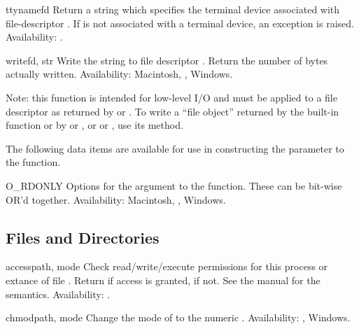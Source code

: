 \begin{funcdesc}{ttyname}{fd}
Return a string which specifies the terminal device associated with
file-descriptor .  If  is not associated with a terminal
device, an exception is raised.
Availability: \UNIX{}.
\end{funcdesc}

\begin{funcdesc}{write}{fd, str}
Write the string  to file descriptor .
Return the number of bytes actually written.
Availability: Macintosh, \UNIX{}, Windows.

Note: this function is intended for low-level I/O and must be applied
to a file descriptor as returned by  or
.  To write a ``file object'' returned by the
built-in function  or by  or
, or  or , use
its  method.
\end{funcdesc}


The following data items are available for use in constructing the
 parameter to the  function.

\begin{datadesc}{O_RDONLY}
Options for the  argument to the  function.
These can be bit-wise OR'd together.
Availability: Macintosh, \UNIX{}, Windows.
\end{datadesc}


\subsection{Files and Directories \label{os-file-dir}}

\begin{funcdesc}{access}{path, mode}
Check read/write/execute permissions for this process or extance of file
.  Return  if access is granted,  if not.
See the \UNIX{} manual for the semantics.
Availability: \UNIX{}.
\end{funcdesc}

\begin{funcdesc}{chmod}{path, mode}
Change the mode of  to the numeric .
Availability: \UNIX{}, Windows.
\end{funcdesc}

